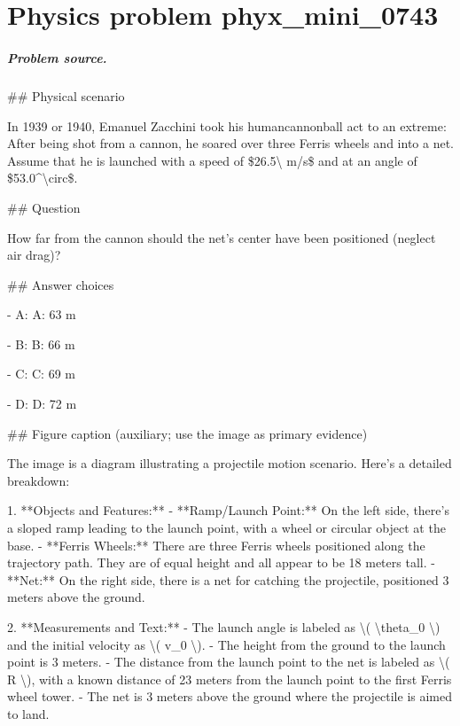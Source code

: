 
\chapter{Physics problem phyx\_mini\_0743}
\label{ch:PhyXMiniProblems_problem_phyx_mini_0743}

\paragraph{Problem source.}
\#\# Physical scenario

In 1939 or 1940, Emanuel Zacchini took his humancannonball act to an extreme: After being shot from a cannon, he soared over three Ferris wheels and into a net. Assume that he is launched with a speed of \$26.5\textbackslash{} m/s\$ and at an angle of \$53.0\textasciicircum{}\textbackslash{}circ\$.

\#\# Question

How far from the cannon should the net's center have been positioned (neglect air drag)?

\#\# Answer choices

- A: A: 63 m

- B: B: 66 m

- C: C: 69 m

- D: D: 72 m

\#\# Figure caption (auxiliary; use the image as primary evidence)

The image is a diagram illustrating a projectile motion scenario. Here's a detailed breakdown:

1. **Objects and Features:**
   - **Ramp/Launch Point:** On the left side, there's a sloped ramp leading to the launch point, with a wheel or circular object at the base.
   - **Ferris Wheels:** There are three Ferris wheels positioned along the trajectory path. They are of equal height and all appear to be 18 meters tall.
   - **Net:** On the right side, there is a net for catching the projectile, positioned 3 meters above the ground.

2. **Measurements and Text:**
   - The launch angle is labeled as \textbackslash{}( \textbackslash{}theta\_0 \textbackslash{}) and the initial velocity as \textbackslash{}( v\_0 \textbackslash{}).
   - The height from the ground to the launch point is 3 meters.
   - The distance from the launch point to the net is labeled as \textbackslash{}( R \textbackslash{}), with a known distance of 23 meters from the launch point to the first Ferris wheel tower.
   - The net is 3 meters above the ground where the projectile is aimed to land.

